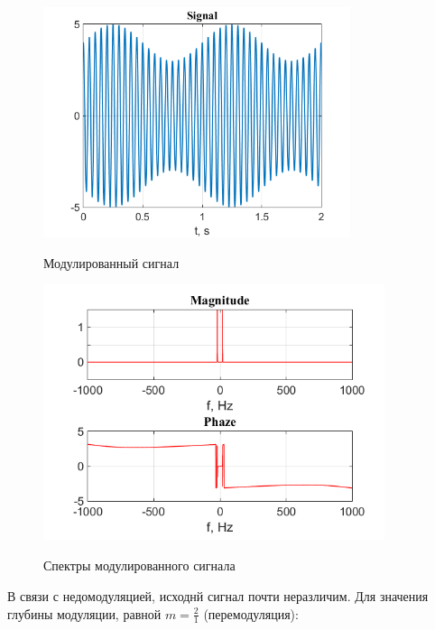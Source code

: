 \documentclass[a4paper,14pt]{article}
\begin{document}
\begin{figure}[h]
	\begin{multicols}{1}
		\hfill
		\includegraphics[width=90mm]{am1_21}
		\hfill
		\caption{Модулированный сигнал}
		\label{figBottom}
		\hfill
		\includegraphics[width=100mm]{am1_21_spec}
		\hfill
		\caption{Спектры модулированного сигнала}
		\label{figDown}
	\end{multicols}
\end{figure}
\newpage
В связи с недомодуляцией, исходнй сигнал почти неразличим.
Для значения глубины модуляции, равной $ m = \frac{2}{1} $ (перемодуляция):
\end{document}
